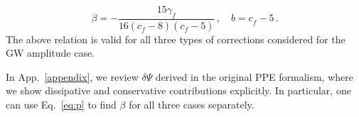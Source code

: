 \documentclass[prd,twocolumn,nofootinbib]{revtex4-1}
\begin{document}
\begin{equation}
\label{eq:2v}
\beta=-\frac{15 \text{$\gamma_{\dot{f}} $}}{16 (\text{$c_{\dot{f}}$}-8) (\text{$c_{\dot{f}}$}-5)}\,, \quad b=c_{\dot{f}}-5\,.
\end{equation}
The above relation is valid for all three types of corrections considered for the GW amplitude case. 

In App.~\ref{appendix}, we review $\delta\Psi$ derived in the original PPE formalism, where we show dissipative and conservative contributions explicitly. In particular, one can use Eq.~\eqref{eq:p} to find $\beta$ for all three cases separately.

\end{document}
